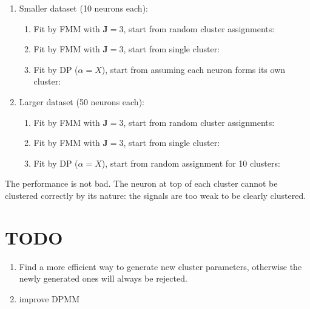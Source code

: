 \documentclass[]{article}
\begin{document}
\begin{enumerate}
	\def\labelenumi{(\arabic{enumi})}
	\item
	Smaller dataset (10 neurons each):\\
	\begin{enumerate}
		\def\labelenumi{\alph{enumi}.}
		\item
		Fit by FMM with \(\mathbf{J} = 3\), start from random cluster assignments:
		\item
		Fit by FMM with \(\mathbf{J} = 3\), start from single cluster:
		\item
		Fit by DP (\(\alpha = X\)), start from assuming each neuron forms its own cluster:
	\end{enumerate}
	
	\item
	Larger dataset (50 neurons each):\\
	\begin{enumerate}
		\def\labelenumi{\alph{enumi}.}
		\item
		Fit by FMM with \(\mathbf{J} = 3\), start from random cluster assignments:
		\item
		Fit by FMM with \(\mathbf{J} = 3\), start from single cluster:
		\item
		Fit by DP (\(\alpha = X\)), start from random assignment for 10 clusters:
	\end{enumerate}
\end{enumerate}

The performance is not bad. The neuron at top of each cluster cannot be clustered correctly by its nature: the signals are too weak to be clearly clustered.

\section{TODO}
\begin{enumerate}
	\def\labelenumi{(\arabic{enumi})}
	\item
	Find a more efficient way to generate new cluster parameters, otherwise the newly generated ones will always be rejected.
	\item
	improve DPMM
\end{enumerate}
\end{document}

